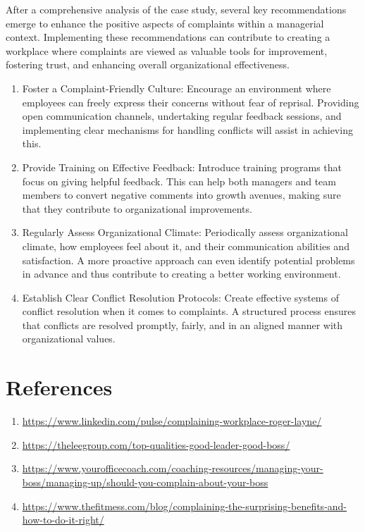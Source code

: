 \documentclass[a4paper,12pt]{report}
\begin{document}
After a comprehensive analysis of the case study, several key recommendations emerge to enhance the positive aspects of complaints within a managerial context. Implementing these recommendations can contribute to creating a workplace where complaints are viewed as valuable tools for improvement, fostering trust, and enhancing overall organizational effectiveness.
\begin{enumerate}
    \item Foster a Complaint-Friendly Culture:
Encourage an environment where employees can freely express their concerns without fear of reprisal. Providing open communication channels, undertaking regular feedback sessions, and implementing clear mechanisms for handling conflicts will assist in achieving this.

    \item Provide Training on Effective Feedback:
Introduce training programs that focus on giving helpful feedback. This can help both managers and team members to convert negative comments into growth avenues, making sure that they contribute to organizational improvements.

    \item Regularly Assess Organizational Climate:
Periodically assess organizational climate, how employees feel about it, and their communication abilities and satisfaction. A more proactive approach can even identify potential problems in advance and thus contribute to creating a better working environment.

    \item Establish Clear Conflict Resolution Protocols:
Create effective systems of conflict resolution when it comes to complaints. A structured process ensures that conflicts are resolved promptly, fairly, and in an aligned manner with organizational values.
\end{enumerate}

\chapter{References}
\begin{enumerate}
  \item \url{https://www.linkedin.com/pulse/complaining-workplace-roger-layne/}
   \item \url{https://theleegroup.com/top-qualities-good-leader-good-boss/}
     \item \url{https://www.yourofficecoach.com/coaching-resources/managing-your-boss/managing-up/should-you-complain-about-your-boss}
     \item \url{https://www.thefitmess.com/blog/complaining-the-surprising-benefits-and-how-to-do-it-right/}    
\end{enumerate}
\end{document}
